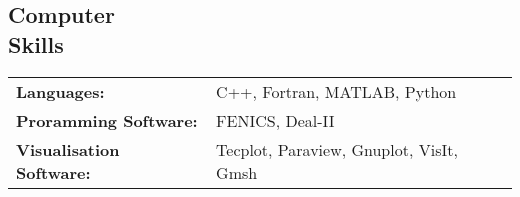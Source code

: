 \documentclass[margin]{res}
\begin{document}
\begin{resume}


\section{Computer \\ Skills}
   \begin{tabular}{l p{3in}}
    {\bf Languages:} & C++, Fortran, MATLAB, Python \\

    {\bf Proramming Software:} &  FENICS, Deal-II \\
    
    {\bf Visualisation Software:} & Tecplot, Paraview, Gnuplot, VisIt, Gmsh
 \end{tabular}


\end{resume} 
\end{document}
